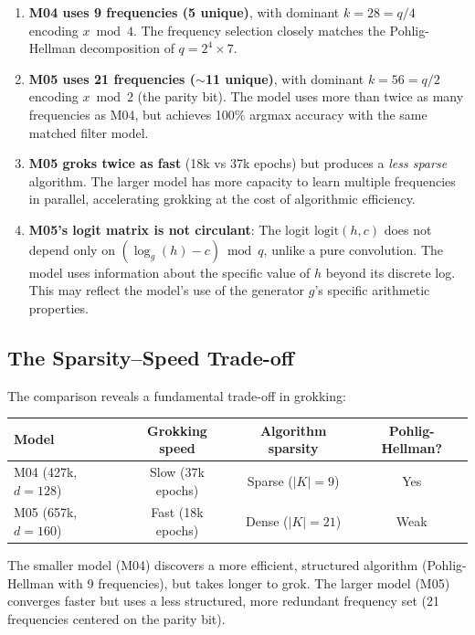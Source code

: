 \documentclass[11pt]{article}
\newcommand{\logg}{\log_g}
\begin{document}
\begin{enumerate}[leftmargin=*]
    \item \textbf{M04 uses 9 frequencies (5 unique)}, with dominant $k = 28 = q/4$ encoding $x \bmod 4$. The frequency selection closely matches the Pohlig-Hellman decomposition of $q = 2^4 \times 7$.

    \item \textbf{M05 uses 21 frequencies ($\sim$11 unique)}, with dominant $k = 56 = q/2$ encoding $x \bmod 2$ (the parity bit). The model uses more than twice as many frequencies as M04, but achieves 100\% argmax accuracy with the same matched filter model.

    \item \textbf{M05 groks twice as fast} (18k vs 37k epochs) but produces a \emph{less sparse} algorithm. The larger model has more capacity to learn multiple frequencies in parallel, accelerating grokking at the cost of algorithmic efficiency.

    \item \textbf{M05's logit matrix is not circulant}: The logit $\text{logit}(h, c)$ does not depend only on $(\logg(h) - c) \bmod q$, unlike a pure convolution. The model uses information about the specific value of $h$ beyond its discrete log. This may reflect the model's use of the generator $g$'s specific arithmetic properties.
\end{enumerate}

\subsection{The Sparsity--Speed Trade-off}

The comparison reveals a fundamental trade-off in grokking:

\begin{center}
\begin{tabular}{lccc}
\toprule
\textbf{Model} & \textbf{Grokking speed} & \textbf{Algorithm sparsity} & \textbf{Pohlig-Hellman?} \\
\midrule
M04 (427k, $d=128$) & Slow (37k epochs) & Sparse ($|K| = 9$) & Yes \\
M05 (657k, $d=160$) & Fast (18k epochs) & Dense ($|K| = 21$) & Weak \\
\bottomrule
\end{tabular}
\end{center}

The smaller model (M04) discovers a more efficient, structured algorithm (Pohlig-Hellman with 9 frequencies), but takes longer to grok. The larger model (M05) converges faster but uses a less structured, more redundant frequency set (21 frequencies centered on the parity bit).
\end{document}
